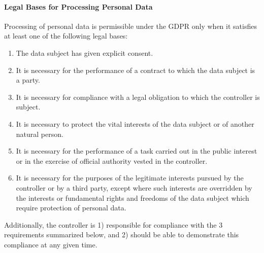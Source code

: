 \paragraph{Legal Bases for Processing Personal Data}
\label{sec:legal-bases-processing-personal-data}
Processing of personal data is permissible under the GDPR only when it satisfies at least one of the following legal bases:
\begin{enumerate}
    \item The data subject has given explicit consent.
    \item It is necessary for the performance of a contract to which the data subject is a party.
    \item It is necessary for compliance with a legal obligation to which the controller is subject.
    \item It is necessary to protect the vital interests of the data subject or of another natural person.
    \item It is necessary for the performance of a task carried out in the public interest or in the exercise of official authority vested in the controller.
    \item It is necessary for the purposes of the legitimate interests pursued by the controller or by a third party, except where such interests are overridden by the interests or fundamental rights and freedoms of the data subject which require protection of personal data.
\end{enumerate}

Additionally, the controller is 1) responsible for compliance with the 3 requirements summarized below, and 2) should be able to demonstrate this compliance at any given time.

